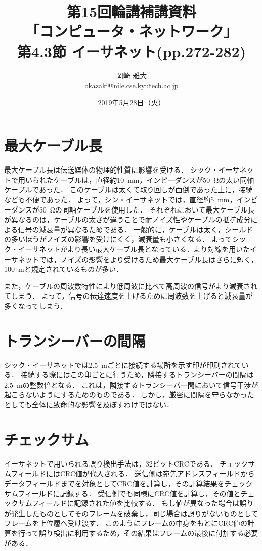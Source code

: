 \documentclass[a4paper]{ltjsarticle}
\title{第15回輪講補講資料\\
「コンピュータ・ネットワーク」\\
第4.3節 イーサネット(pp.272-282)}
\author{岡崎 雅大 \\
okazaki@nile.cse.kyutech.ac.jp}
\date{2019年5月28日（火）}
\begin{document}
\maketitle

\section{最大ケーブル長}\label{ux6700ux5927ux30b1ux30fcux30d6ux30ebux9577}

最大ケーブル長は伝送媒体の物理的性質に影響を受ける．
シック・イーサネットで用いられたケーブルは，直径約\SI{10}{mm}，インピーダンスが\SI{50}{\ohm}の太い同軸ケーブルであった．
このケーブルは太くて取り回しが面倒であった上に，接続なども不便であった．
よって，シン・イーサネットでは，直径約\SI{5}{mm}，インピーダンスが\SI{50}{\ohm}の同軸ケーブルを使用した．
それぞれにおいて最大ケーブル長が異なるのは，ケーブルの太さが違うことで耐ノイズ性やケーブルの抵抗成分による信号の減衰量が異なるためである．
一般的に，ケーブルは太く，シールドの多いほうがノイズの影響を受けにくく，減衰量も小さくなる．
よってシック・イーサネットがより長い最大ケーブル長となっている．より対線を用いたイーサネットでは，ノイズの影響をより受けるため最大ケーブル長はさらに短く，\SI{100}{m}と規定されているものが多い．

また，ケーブルの周波数特性により低周波に比べて高周波の信号がより減衰されてしまう．
よって，信号の伝達速度を上げるために周波数を上げると減衰量が多くなってしまう．

\section{トランシーバーの間隔}\label{ux30c8ux30e9ux30f3ux30b7ux30fcux30d0ux30fcux306eux9593ux9694}

シック・イーサネットでは\SI{2.5}{m}ごとに接続する場所を示す印が印刷されている．
接続する際にはこの印ごとに行うため，隣接するトランシーバーの間隔は\SI{2.5}{m}の整数倍となる．
これは，隣接するトランシーバー間において信号干渉が起こらないようにするためのものである．
しかし，厳密に間隔を守らなかったとしても全体に致命的な影響を及ぼすわけではない．

\section{チェックサム}\label{ux30c1ux30a7ux30c3ux30afux30b5ux30e0}

イーサネットで用いられる誤り検出手法は，32ビットCRCである．
チェックサムフィールドにはCRC値が代入される．
送信側は宛先アドレスフィールドからデータフィールドまでを対象としてCRC値を計算し，その計算結果をチェックサムフィールドに記録する．
受信側でも同様にCRC値を計算し，その値とチェックサムフィールドに記録された値を比較する．
もし値が異なった場合は誤りが発生したものとしてそのフレームを破棄し，同じ場合は誤りがないものとしてフレームを上位層へ受け渡す．
このようにフレームの中身をもとにCRC値の計算を行って誤り検出に利用するため，その結果はフレームの最後に付加する必要がある．
\end{document}
